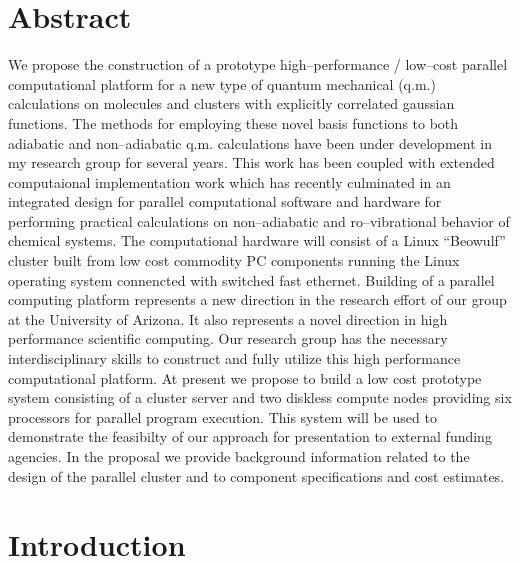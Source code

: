 \section{Abstract}
We propose the construction of a 
prototype high--performance / low--cost parallel computational platform
for a new type of quantum mechanical (q.m.) calculations on molecules
and clusters with explicitly correlated gaussian functions.
The methods for employing these novel basis functions
to both adiabatic and non--adiabatic q.m. calculations have
been under development in my research group for several 
years. This work has been coupled with extended computaional
implementation work which has recently culminated in an
integrated design
for parallel computational software and hardware
for performing practical calculations on non--adiabatic
and ro--vibrational behavior of chemical systems.
The computational hardware will consist of a Linux ``Beowulf'' cluster built 
from low cost commodity PC components running the Linux operating system
connencted with switched fast ethernet. 
Building of a  parallel computing platform 
represents a new direction in the research effort of our group at the University of Arizona. 
It also represents a novel direction in high performance scientific computing. 
Our research group has the necessary interdisciplinary skills to
construct and fully utilize this high performance computational 
platform.   
At present we propose to build a low cost prototype
system consisting of a cluster server and two diskless compute nodes
providing six  processors for parallel program execution. This system will be used
to demonstrate the feasibilty of our approach for
presentation to external funding agencies. 
In the proposal we provide background
information related to the design of the parallel cluster and 
to component specifications
and cost estimates.

\newpage


\section{Introduction}

